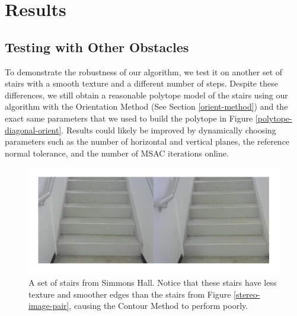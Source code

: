 
\section{Results}

\subsection{Testing with Other Obstacles}

To demonstrate the robustness of our algorithm, we test it on another set of stairs with a smooth texture and a different number of steps. Despite these differences, we still obtain a reasonable polytope model of the stairs using our algorithm with the Orientation Method (See Section \ref{orient-method}) and the exact same parameters that we used to build the polytope in Figure \ref{polytope-diagonal-orient}. Results could likely be improved by dynamically choosing parameters such as the number of horizontal and vertical planes, the reference normal tolerance, and the number of MSAC iterations online.

\begin{figure}[!h]
\centering
\includegraphics[width=\columnwidth]{Sections/Figures/simmons-stereo-pair.jpg}
\caption{A set of stairs from Simmons Hall. Notice that these stairs have less texture and smoother edges than the stairs from Figure \ref{stereo-image-pair}, causing the Contour Method to perform poorly.}
\label{simmons-pair}
\end{figure}


